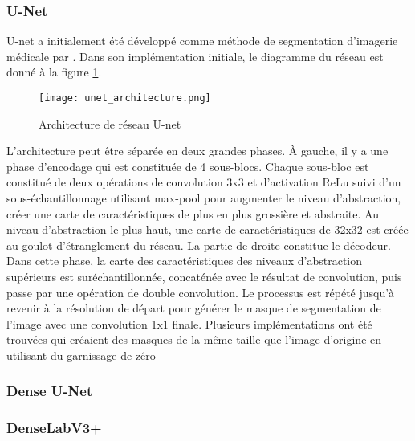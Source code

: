   \subsubsection{U-Net}
    U-net a initialement été développé comme méthode de segmentation d'imagerie médicale par \textcite{ronneberger_u-net_2015}. Dans son implémentation initiale, le diagramme du réseau est donné à la figure \ref{fig:unet_arch}.
    \begin{figure}[!h]
      \centering
      \texttt{[image: unet\_architecture.png]}
      \caption{Architecture de réseau U-net \parencite{ronneberger_u-net_2015}}
      \label{fig:unet_arch}
    \end{figure}
    L'architecture peut être séparée en deux grandes phases. À gauche, il y a une phase d'encodage qui est constituée de 4 sous-blocs. Chaque sous-bloc est constitué de deux opérations de convolution 3x3 et d'activation \ac{ReLu} suivi d'un sous-échantillonnage utilisant max-pool pour augmenter le niveau d'abstraction, créer une carte de caractéristiques de plus en plus grossière et abstraite. Au niveau d'abstraction le plus haut, une carte de caractéristiques de 32x32 est créée au goulot d'étranglement du réseau. La partie de droite constitue le décodeur. Dans cette phase, la carte des caractéristiques des niveaux d'abstraction supérieurs est suréchantillonnée, concaténée avec le résultat de convolution, puis passe par une opération de double convolution. Le processus est répété jusqu'à revenir à la résolution de départ pour générer le masque de segmentation de l'image avec une convolution 1x1 finale. Plusieurs implémentations ont été trouvées qui créaient des masques de la même taille que l'image d'origine en utilisant du garnissage de zéro 
  \subsubsection{Dense U-Net}

  \subsubsection{DenseLabV3+}
